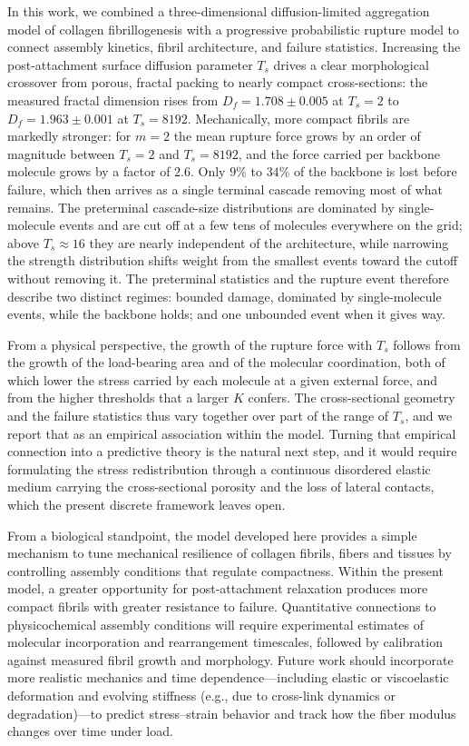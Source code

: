 \documentclass[aps,physrev,preprint,groupedaddress,linenumbers]{revtex4-2}
\newcommand{\rev}[1]{{\color{blue}#1}}
\begin{document}
In this work, we combined a three-dimensional diffusion-limited aggregation model of collagen fibrillogenesis with a progressive probabilistic rupture model to connect assembly kinetics, fibril architecture, and failure statistics. Increasing the post-attachment surface diffusion parameter $T_s$ drives a clear morphological crossover from porous, fractal packing to nearly compact cross-sections: the measured fractal dimension rises from $D_f=1.708\pm0.005$ at $T_s=2$ to $D_f=1.963\pm0.001$ at $T_s=8192$. \rev{Mechanically, more compact fibrils are markedly stronger: for $m = 2$ the mean rupture force grows by an order of magnitude between $T_s = 2$ and $T_s = 8192$, and the force carried per backbone molecule grows by a factor of $2.6$. Only $9\%$ to $34\%$ of the backbone is lost before failure, which then arrives as a single terminal cascade removing most of what remains. The preterminal cascade-size distributions are dominated by single-molecule events and are cut off at a few tens of molecules everywhere on the grid; above $T_s \approx 16$ they are nearly independent of the architecture, while narrowing the strength distribution shifts weight from the smallest events toward the cutoff without removing it. The preterminal statistics and the rupture event therefore describe two distinct regimes: bounded damage, dominated by single-molecule events, while the backbone holds; and one unbounded event when it gives way.}

\rev{From a physical perspective, the growth of the rupture force with $T_s$ follows from the growth of the load-bearing area and of the molecular coordination, both of which lower the stress carried by each molecule at a given external force, and from the higher thresholds that a larger $K$ confers. The cross-sectional geometry and the failure statistics thus vary together over part of the range of $T_s$, and we report that as an empirical association within the model. Turning that empirical connection into a predictive theory is the natural next step, and it would require formulating the stress redistribution through a continuous disordered elastic medium carrying the cross-sectional porosity and the loss of lateral contacts, which the present discrete framework leaves open.}


From a biological standpoint, the model developed here provides a simple mechanism to tune mechanical resilience of collagen fibrils, fibers and tissues by controlling assembly conditions that regulate compactness. \rev{Within the present model, a greater opportunity for post-attachment relaxation produces more compact fibrils with greater resistance to failure. Quantitative connections to physicochemical assembly conditions will require experimental estimates of molecular incorporation and rearrangement timescales, followed by calibration against measured fibril growth and morphology.} Future work should incorporate more realistic mechanics and time dependence---including elastic or viscoelastic deformation and evolving stiffness (e.g., due to cross-link dynamics or degradation)---to predict stress--strain behavior and track how the fiber modulus changes over time under load.
\end{document}

